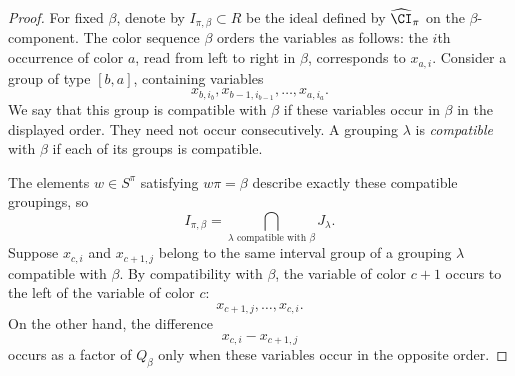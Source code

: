 \documentclass[11pt,reqno]{amsart}
\begin{document}
\begin{proof}
For fixed $\beta$, denote by $I_{\pi, \beta}\subset R$ be the ideal defined by $\widehat \CI_\pi$ on the $\beta$-component. The color sequence $\beta$ orders the variables as follows: the $i$th occurrence of color $a$, read from left to right in $\beta$,
corresponds to $x_{a,i}$. Consider a group of type $[b,a]$, containing variables \[
x_{b,i_b},x_{b-1,i_{b-1}},\ldots,x_{a,i_a}.\] We say that this group is compatible with $\beta$ if these variables
occur in $\beta$ in the displayed order. They need not occur
consecutively. A grouping $\lambda$ is \textit{compatible} with $\beta$ if each of its
groups is compatible.

The elements $w\in S^\pi$ satisfying $w\pi=\beta$ describe exactly
these compatible groupings, so\[
I_{\pi,\beta}
=
\bigcap_{\lambda\text{ compatible with }\beta}J_\lambda.\] Suppose $x_{c,i}$ and $x_{c+1,j}$ belong to the same interval
group of a grouping $\lambda$ compatible with $\beta$. By compatibility with $\beta$, the variable of color $c+1$ occurs to the left of the
variable of color $c$:
\[
x_{c+1,j}, \ldots, x_{c,i}.
\]
On the other hand, the difference
\[
x_{c,i}-x_{c+1,j}
\]
occurs as a factor of $Q_\beta$ only when these variables occur in the
opposite order. 


\end{proof}
\end{document}
